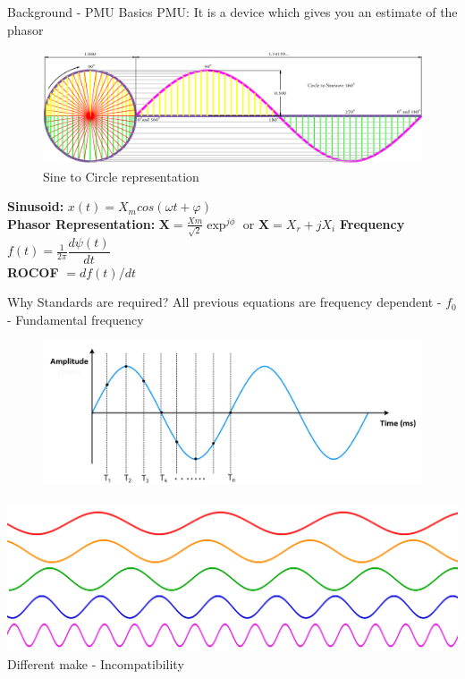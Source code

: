 \documentclass{beamer}
\begin{document}
   \begin{frame}{Background - PMU Basics}
   PMU: It is a device which gives you an estimate of the phasor 
   \begin{figure}
   \includegraphics*[scale = 0.2]{Circle-To-Sine-Wave.png}
   \caption{Sine to Circle representation \cite{site:westau}}
   \end{figure}

   \textbf{Sinusoid:} \textbf{$x(t) = X_m cos(\omega t + \varphi)$} \\
	\textbf{Phasor Representation:} $\textbf{X} = \frac{Xm}{\sqrt{2}}\exp^{j\phi} $ or $\textbf{X} = X_r+jX_i$
	\textbf{Frequency} $f(t) = \frac{1}{2\pi} \dfrac{d\psi(t)}{dt}$\\
	\textbf{ROCOF} $= df(t)/dt$
   
   \end{frame}

\begin{frame}{Why Standards are required?}
\centering
All previous equations are frequency dependent - $f_0$ - Fundamental frequency
\begin{figure}
\includegraphics[scale=0.2]{sine_sampled.png} \\
\end{figure}
\pause
\includegraphics[scale=0.1]{multisine.png}\\
Different make - Incompatibility 
\end{frame}
   
\end{document}
